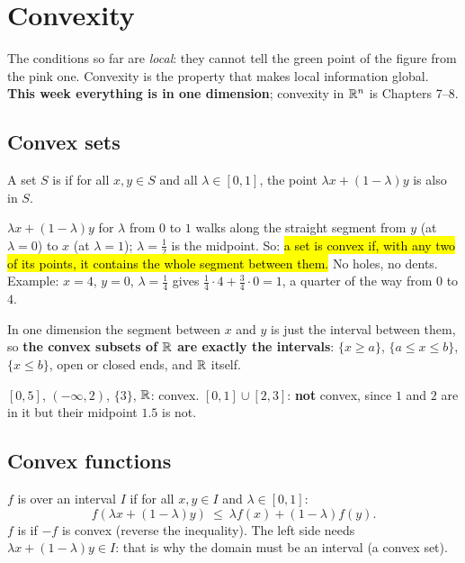 \section{Convexity}

The conditions so far are \emph{local}: they cannot tell the green point of the figure from the pink one. Convexity is the property that
makes local information global. \textbf{This week everything is in one dimension}; convexity in $\mathbb{R}^n$ is Chapters 7--8.

\subsection{Convex sets}

\begin{defn}
A set $S$ is  if for all $x,y\in S$ and all $\lambda\in[0,1]$, the point $\lambda x+(1-\lambda)y$ is also in $S$.
\end{defn}

\begin{intuition}
$\lambda x+(1-\lambda)y$ for $\lambda$ from $0$ to $1$ walks along the straight segment from $y$ (at $\lambda=0$) to $x$ (at $\lambda=1$); $\lambda=\tfrac12$ is the midpoint.
So: \hl{a set is convex if, with any two of its points, it contains the whole segment between them.} No holes, no dents.
Example: $x=4$, $y=0$, $\lambda=\tfrac14$ gives $\tfrac14\cdot4+\tfrac34\cdot0=1$, a quarter of the way from $0$ to $4$.
\end{intuition}

In one dimension the segment between $x$ and $y$ is just the interval between them, so \textbf{the convex subsets of $\mathbb{R}$ are exactly the intervals}:
$\{x\ge a\}$, $\{a\le x\le b\}$, $\{x\le b\}$, open or closed ends, and $\mathbb{R}$ itself. 

\begin{example}
$[0,5]$, $(-\infty,2)$, $\{3\}$, $\mathbb{R}$: convex. $[0,1]\cup[2,3]$: \textbf{not} convex, since $1$ and $2$ are in it but their midpoint $1.5$ is not.
\end{example}

\subsection{Convex functions}

\begin{defn}
$f$ is  over an interval $I$ if for all $x,y\in I$ and $\lambda\in[0,1]$:
\[ f(\lambda x+(1-\lambda)y)\ \le\ \lambda f(x)+(1-\lambda)f(y). \]
$f$ is  if $-f$ is convex (reverse the inequality).
The left side needs $\lambda x+(1-\lambda)y\in I$: that is why the domain must be an interval (a convex set). 
\end{defn}

